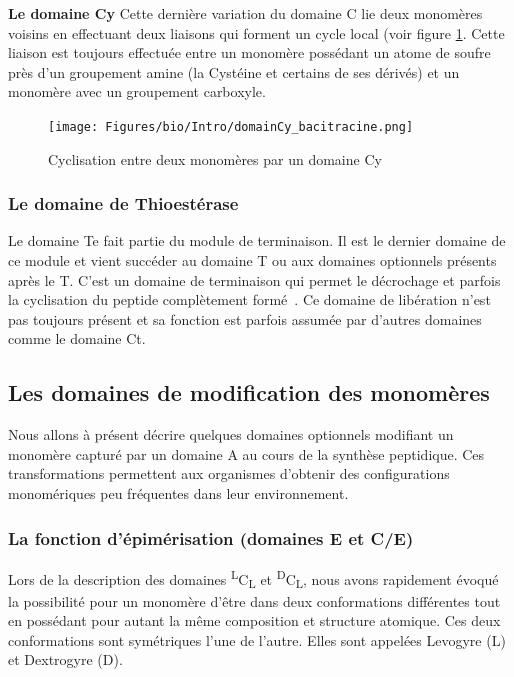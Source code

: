 \textbf{Le domaine Cy}
\label{Cy}
Cette dernière variation du domaine C lie deux monomères voisins en effectuant deux liaisons qui forment un cycle local (voir figure \ref{domaine_Cy}.
Cette liaison est toujours effectuée entre un monomère possédant un atome de soufre près d'un groupement amine (la Cystéine et certains de ses dérivés) et un monomère avec un groupement carboxyle.

\begin{figure}[h!]
  \begin{center}
    \texttt{[image: Figures/bio/Intro/domainCy\_bacitracine.png]}
    \caption{\label{domaine_Cy}Cyclisation entre deux monomères par un domaine Cy}
  \end{center}
\end{figure}


\subsubsection{Le domaine de Thioestérase}

Le domaine Te fait partie du module de terminaison.
Il est le dernier domaine de ce module et vient succéder au domaine T ou aux domaines optionnels présents après le T.
C'est un domaine de terminaison qui permet le décrochage et parfois la cyclisation du peptide complètement formé~\cite{trauger_peptide_2000,kohli_thioesterase_2002}.
Ce domaine de libération n'est pas toujours présent et sa fonction est parfois assumée par d'autres domaines comme le domaine Ct.


\subsection{Les domaines de modification des monomères}

Nous allons à présent décrire quelques domaines optionnels modifiant un monomère capturé par un domaine A au cours de la synthèse peptidique.
Ces transformations permettent aux organismes d'obtenir des configurations monomériques peu fréquentes dans leur environnement.


\subsubsection{La fonction d'épimérisation (domaines E et C/E)}

Lors de la description des domaines \textsuperscript{L}C\textsubscript{L} et \textsuperscript{D}C\textsubscript{L}, nous avons rapidement évoqué la possibilité pour un monomère d'être dans deux conformations différentes tout en possédant pour autant la même composition et structure atomique.
Ces deux conformations sont symétriques l'une de l'autre.
Elles sont appelées Levogyre (L) et Dextrogyre (D).

